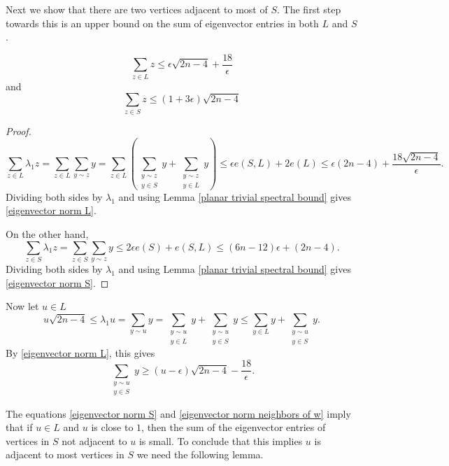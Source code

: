 Next we show that there are two vertices adjacent to most of $S$. The first step towards this is an upper bound on the sum of eigenvector entries in both $L$ and $S$.
\begin{lemma}
\begin{equation}\label{eigenvector norm L}
\sum_{z\in L} z \leq  \epsilon \sqrt{2n-4} + \frac{18}{\epsilon}
\end{equation}
\noindent and
 \begin{equation}\label{eigenvector norm S}
 \sum_{z\in S} z \leq (1+3\epsilon)\sqrt{2n-4}
 \end{equation}

\end{lemma}
\begin{proof}
\[
\sum_{z\in L} \lambda_1z = \sum_{z\in L} \sum_{y\sim z} y = \sum_{z\in L}\left( \sum_{\substack{y\sim z \\ y\in S}} y + \sum_{\substack{y\sim z\\ y\in L}} y \right) \leq \epsilon e(S,L) + 2e(L) \leq \epsilon (2n-4) + \frac{18\sqrt{2n-4}}{\epsilon}.
\]
Dividing both sides by $\lambda_1$ and using Lemma \ref{planar trivial spectral bound} gives \eqref{eigenvector norm L}.

 On the other hand,
 \[
 \sum_{z\in S} \lambda_1z = \sum_{z\in S}\sum_{y\sim z} y \leq 2\epsilon e(S) + e(S,L) \leq (6n-12)\epsilon  + (2n-4).
 \]
 Dividing both sides by $\lambda_1$ and using Lemma \ref{planar trivial spectral bound} gives \eqref{eigenvector norm S}.
 \end{proof}

 Now let $u\in L$
\[
u\sqrt{2n-4} \leq \lambda_1u=\sum_{y\sim u} y = \sum_{\substack{y\sim u \\ y\in L}} y + \sum_{\substack{y\sim u\\ y\in S}} y \leq \sum_{y\in L} y + \sum_{\substack{y\sim u \\y\in S}} y.
\]
By \eqref{eigenvector norm L}, this gives
\begin{equation}\label{eigenvector norm neighbors of w}
\sum_{\substack{y\sim u \\ y\in S}} y \geq (u-\epsilon)\sqrt{2n-4} - \frac{18}{\epsilon}.
\end{equation}

 
 The equations \eqref{eigenvector norm S} and \eqref{eigenvector norm neighbors of w} imply that if $u\in L$ and $u$ is close to $1$, then the sum of the eigenvector entries of vertices in $S$ not adjacent to $u$ is small. To conclude that this implies $u$ is adjacent to most vertices in $S$ we need the following lemma.
 
